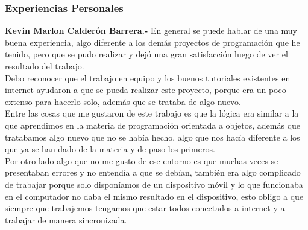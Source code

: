 \documentclass[10pt]{article}
\begin{document}
{\begin{flushleft}
\subsubsection{Experiencias Personales}
\textbf{Kevin Marlon Calder\'on Barrera.- } En general se puede hablar de una muy buena experiencia, algo diferente a los dem\'as proyectos de programaci\'on que he tenido, pero que se pudo realizar y dej\'o una gran satisfacci\'on luego de ver el resultado del trabajo.\\\vspace{0.1in}
Debo reconocer que el trabajo en equipo y los buenos tutoriales existentes en internet ayudaron a que se pueda realizar este proyecto, porque era un poco extenso para hacerlo solo, adem\'as que se trataba de algo nuevo.\\
Entre las cosas que me gustaron de este trabajo es que la l\'ogica era similar a la que aprendimos en la materia de programaci\'on orientada a objetos, adem\'as que tratabamos algo nuevo que no se hab\'ia hecho, algo que nos hac\'ia diferente a los que ya se han dado de la materia y de paso los primeros.\\\vspace{0.1in}
Por otro lado algo que no me gusto de ese entorno es que muchas veces se presentaban errores y no entend\'ia a que se deb\'ian, tambi\'en era algo complicado de trabajar porque solo dispon\'iamos de un dispositivo m\'ovil y lo que funcionaba en el computador no daba el mismo resultado en el dispositivo, esto obligo a que siempre que trabajemos tengamos que estar todos conectados a internet y a trabajar de manera sincronizada.

\newpage

\end{flushleft}}
\end{document}
